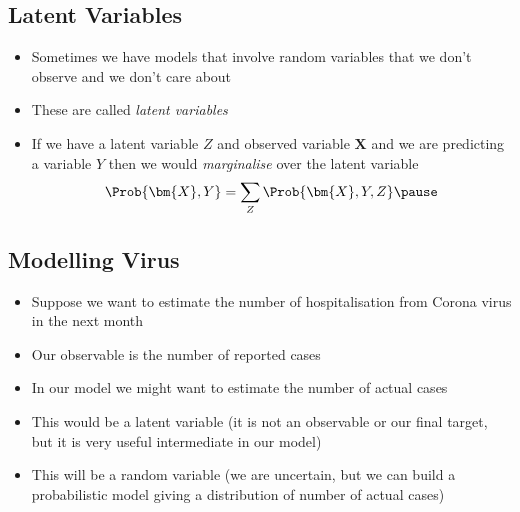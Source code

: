 
\begin{slide}
\section{Latent Variables}

\begin{PauseHighLight}
  \begin{itemize}
  \item Sometimes we have models that involve random variables that we
    don't observe and we don't care about\pause
  \item These are called \emph{latent variables}\pause
  \item If we have a latent variable $Z$ and observed variable $\bm{X}$
    and we are predicting a variable $Y$ then we would
    \emph{marginalise} over the latent variable
    \begin{align*}
      \Prob{\bm{X}, Y} = \sum_Z \Prob{\bm{X}, Y, Z}\pause
    \end{align*}
  \end{itemize}
\end{PauseHighLight}

\end{slide}


\begin{slide}
\section{Modelling Virus}

\begin{PauseHighLight}
  \begin{itemize}
  \item Suppose we want to estimate the number of hospitalisation from Corona
    virus in the next month\pause
  \item Our observable is the number of reported cases\pause
  \item In our model we might want to estimate the number of actual
    cases\pause
  \item This would be a latent variable (it is not an observable or
    our final target, but it is very useful intermediate in our
    model)\pause
  \item This will be a random variable (we are uncertain, but we can
    build a probabilistic model giving a distribution of number of
    actual cases)\pause
  \end{itemize}
\end{PauseHighLight}

\end{slide}



